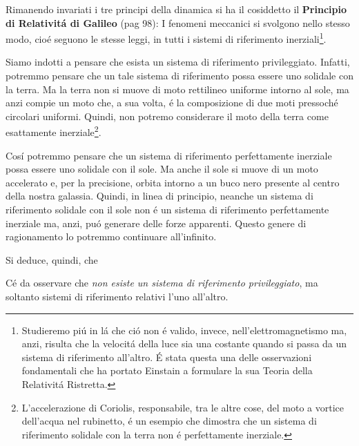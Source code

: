 \documentclass[17pt]{extarticle}
\begin{document}
Rimanendo invariati i tre principi della dinamica si ha il cosiddetto il {\bf Principio di Relativit\'a di Galileo}  (pag 98): I fenomeni meccanici si svolgono nello stesso modo, cio\'e seguono le stesse leggi, in tutti i sistemi di riferimento inerziali\footnote{Studieremo pi\'u in l\'a che ci\'o non \'e valido, invece, nell'elettromagnetismo ma, anzi, risulta che la velocit\'a della luce sia una costante quando si passa da un sistema di riferimento all'altro. \'E stata questa una delle osservazioni fondamentali che ha portato Einstain a formulare la sua Teoria della Relativit\'a Ristretta.}.

Siamo indotti a pensare che esista un sistema di riferimento privileggiato.
Infatti, potremmo pensare che un tale sistema di riferimento possa essere uno solidale con la terra. Ma la terra non si muove di moto rettilineo uniforme intorno al sole, ma anzi compie un moto che, a sua volta, \'e la composizione di due moti pressoch\'e circolari uniformi. Quindi, non potremo considerare il moto della terra come esattamente inerziale\footnote{L'accelerazione di Coriolis, responsabile, tra le altre cose, del moto a vortice dell'acqua nel rubinetto, \'e un esempio che dimostra che un sistema di riferimento solidale con la terra non \'e perfettamente inerziale.}. 

Cos\'i potremmo pensare che un sistema di riferimento perfettamente inerziale possa essere uno solidale con il sole. Ma anche il sole si muove di un moto accelerato e, per la precisione, orbita intorno a un buco nero presente al centro della nostra galassia. Quindi, in linea di principio, neanche un sistema di riferimento solidale con il sole non \'e un sistema di riferimento perfettamente inerziale ma, anzi, pu\'o generare delle forze apparenti. Questo genere di ragionamento lo potremmo continuare all'infinito. 




Si deduce, quindi, che 

C\'e da osservare che \emph{non esiste un sistema di riferimento privileggiato}, ma soltanto sistemi di riferimento relativi l'uno all'altro. 
\end{document}
